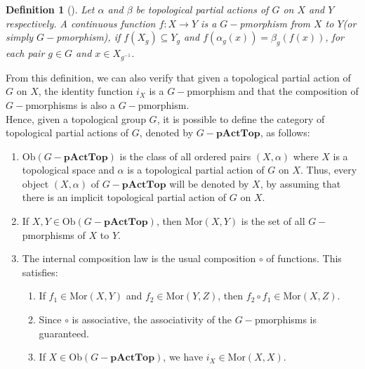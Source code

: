 \documentclass[sn-mathphys-num]{sn-jnl}%
\theoremstyle{thmstyleone}%
\theoremstyle{thmstyletwo}%
\theoremstyle{thmstylethree}%
\newtheorem{definition}{Definition}%
\begin{document}
\begin{definition}[\cite{Abadie2}]\label{defmor}
Let  $ \alpha $ and $ \beta $ be topological partial actions of $ G $ on $ X $ and $ Y $ respectively. A continuous function $ f: X \to Y $ is a $ G-$pmorphism from $ X $ to $ Y $(or simply $G-$pmorphism), if $ f (X_g) \subseteq Y_g $ and $ f (\alpha_g (x)) = \beta_g (f (x)) $, for each pair $ g \in G $ and $ x \in X_{g^{- 1}}$.\\
\end{definition}

From this definition, we can also verify that given a topological partial action  of $ G $ on $ X $, the identity function $ i_ {X} $ is a $ G-$pmorphism and that the composition of $G-$pmorphisms is also a $G-$pmorphism.\\

Hence,  given a topological group $ G $, it is possible to define the category of topological partial actions of $G$, denoted by $G-\mathbf{pActTop}$, as follows:
\begin{enumerate}
\item $\text{Ob} (G-\mathbf{pActTop}) $ is the class of all ordered pairs $(X,\alpha)$ where $X$ is a topological space and $\alpha$ is a  topological partial action of $G$ on  $X$. Thus, every object $(X,\alpha)$  of $G-\mathbf{pActTop}$ will be denoted by $X$, by assuming that there is an implicit topological partial action of $G$ on $X$.
\item If $ X, Y \in \text{Ob} (G-\mathbf{pActTop}) $, then $ \text{Mor}(X, Y) $ is the set of all $ G-$pmorphisms of $ X $ to $ Y $.
\item The internal composition law is the usual composition $ \circ $ of functions. This satisfies:
  \begin{enumerate}
\item If $ f_1 \in \text{Mor} (X, Y) $ and $ f_2 \in \text{Mor} (Y, Z) $, then $ f_2 \circ f_1 \in \text{Mor} (X , Z) $.
\item Since $ \circ $ is associative, the associativity of the $G-$pmorphisms is guaranteed.
\item If $ X \in \text{Ob} (G-\mathbf{pActTop})$, we have $ i_ {X} \in \text{Mor} (X, X) $.
  \end{enumerate}
  \end{enumerate}
\end{document}
